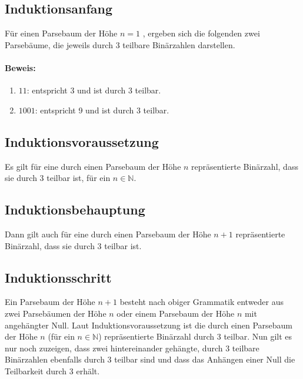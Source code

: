 \documentclass[a4paper,10pt]{scrartcl}
\begin{document}
\subsection*{Induktionsanfang}
Für einen Parsebaum der Höhe $n = 1$ , ergeben sich die folgenden zwei Parsebäume, die jeweils durch 3 teilbare Binärzahlen darstellen.
\begin{center}
  \hspace*{3cm}
\end{center}

\paragraph{Beweis:}
\begin{enumerate}
 \item $11$: entspricht 3 und ist durch 3 teilbar.
 \item $1001$: entspricht 9 und ist durch 3 teilbar.
\end{enumerate}

\subsection*{Induktionsvoraussetzung}
Es gilt für eine durch einen Parsebaum der Höhe $n$ repräsentierte Binärzahl, dass sie durch 3 teilbar ist, für ein $n \in \mathbb{N}$.
\subsection*{Induktionsbehauptung}
Dann gilt auch für eine durch einen Parsebaum der Höhe $n + 1$ repräsentierte Binärzahl, dass sie durch 3 teilbar ist.
\subsection*{Induktionsschritt}
Ein Parsebaum der Höhe $n + 1$ besteht nach obiger Grammatik entweder aus zwei Parsebäumen der Höhe $n$ oder einem Parsebaum der Höhe $n$ mit angehängter Null.
Laut Induktionsvoraussetzung ist die durch einen Parsebaum der Höhe $n$ (für ein $n \in \mathbb{N}$) repräsentierte Binärzahl durch 3 teilbar.
Nun gilt es nur noch zuzeigen, dass zwei hintereinander gehängte, durch 3 teilbare Binärzahlen ebenfalls durch 3 teilbar sind und dass das Anhängen einer Null die Teilbarkeit durch 3 erhält.
\end{document}
